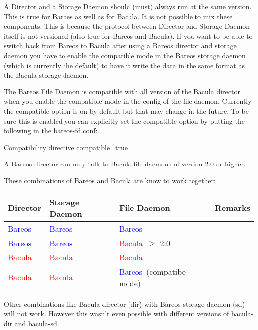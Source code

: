 A Director and a Storage Daemon should (must) always run at the same version.
This is true for Baroes as well as for Bacula.
It is not possible to mix these components.
This is because the protocol between Director and Storage Daemon itself is not versioned (also true for Bareos and Bacula).
If you want to be able to switch back from Bareos to Bacula after using a Bareos director and storage daemon
you have to enable the compatible mode in the Bareos storage daemon (which is currently the default)
to have it write the data in the same format as the Bacula storage daemon.

The Bareos File Daemon is compatible with all version of the Bacula director
when you enable the compatible mode in the config of the file daemon.
Currently the compatible option is on by default but that may change in the future.
To be sure this is enabled you can explicitly set the compatible option
by putting the following in the bareos-fd.conf:

\begin{bconfig}{Compatibility directive}
compatible=true
\end{bconfig}


A Bareos director can only talk to Bacula file daemons of version 2.0 or higher.

\newcommand{\bareoscolor}{\textcolor{blue}{Bareos\ }}
\newcommand{\baculacolor}{\textcolor{red}{Bacula\ }}


These combinations of Bareos and Bacula are know to work together:

\begin{tabular}[h]{|l|l|l|l|}
  \hline
  \textbf{Director} & \textbf{Storage Daemon} & \textbf{File Daemon} & \textbf{Remarks} \\
  \hline
  \hline
  \bareoscolor & \bareoscolor & \bareoscolor & \\
  \hline
  \bareoscolor & \bareoscolor & \baculacolor $\ge$ 2.0 & \\
  \hline
  \baculacolor & \baculacolor & \baculacolor & \\
  \hline
  \baculacolor & \baculacolor & \bareoscolor (compatibe mode) & \\
  \hline
\end{tabular}

Other combinations like Bacula director (dir) with Bareos storage daemon (sd) will not work. However this wasn't even possible with different versions of bacula-dir and bacula-sd.
